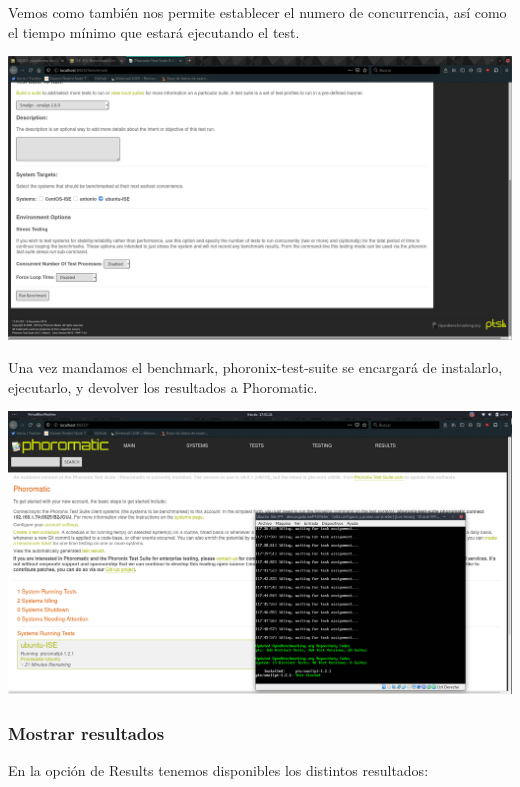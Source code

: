 \documentclass[12pt, spanish]{article}
\begin{document}
\newpage
Vemos como también nos permite establecer el numero de concurrencia, así como el tiempo mínimo que estará ejecutando el test.

\begin{center}
\includegraphics[scale=0.25]{phoromatic_exec2.png}
\end{center}


Una vez mandamos el benchmark, phoronix-test-suite se encargará de instalarlo, ejecutarlo, y devolver los resultados a Phoromatic.

\begin{center}
\includegraphics[scale=0.25]{phoromatic_ejecucion.png}
\end{center}


\subsubsection{Mostrar resultados}

En la opción de Results tenemos disponibles los distintos resultados:
\end{document}
